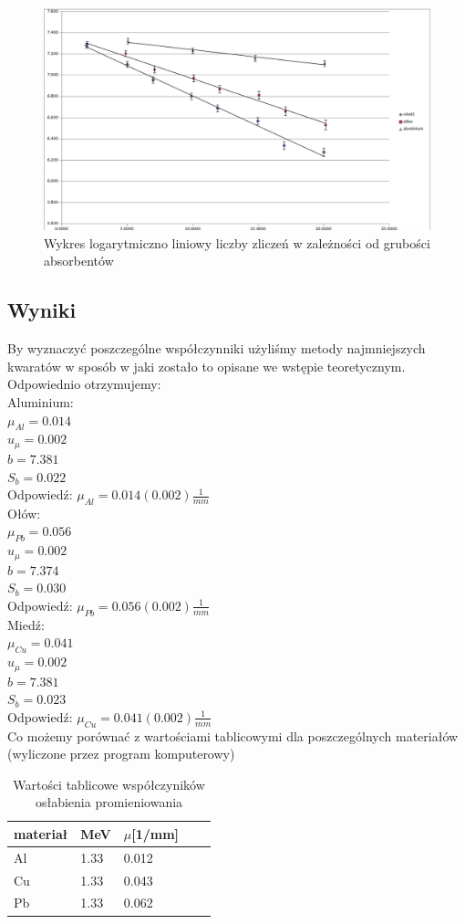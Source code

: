 \documentclass[a4paper]{article}
\begin{document}
\begin{figure}[h!]
\centering
\includegraphics[scale=0.51]{ln_x_wykres.png}
\caption{Wykres logarytmiczno liniowy liczby zliczeń w zależności od grubości absorbentów}
\label{uklad_pomiarowy}
\end{figure}

\newpage
\subsection{Wyniki}
By wyznaczyć poszczególne współczynniki użyliśmy metody najmniejszych kwaratów w sposób w jaki zostało to opisane we wstępie teoretycznym. Odpowiednio otrzymujemy: \\
Aluminium:\\
$\mu_{Al} = 0.014$\\
$u_{\mu} = 0.002$\\
$b = 7.381$\\
$S_{b} = 0.022$\\
Odpowiedź: $\mu_{Al} = 0.014(0.002) \frac{1}{mm}$\\
Ołów:\\
$\mu_{Pb} = 0.056$\\
$u_{\mu} = 0.002$\\
$b = 7.374$\\
$S_{b} = 0.030$\\

Odpowiedź: $\mu_{Pb} = 0.056(0.002) \frac{1}{mm}$\\
Miedź:\\
$\mu_{Cu} = 0.041$\\
$u_{\mu} = 0.002$\\
$b = 7.381$\\
$S_{b} = 0.023$\\
Odpowiedź: $\mu_{Cu} = 0.041(0.002) \frac{1}{mm}$ \\
Co możemy porównać z wartościami tablicowymi dla poszczególnych materiałów (wyliczone przez program komputerowy)
\begin{table}[h!]
\centering
\begin{tabular}{ | l | l | l | l | l | }
\hline
materiał & MeV & $\mu$[1/mm] \\ \hline
Al & 1.33 & 0.012 \\ \hline  
Cu & 1.33 & 0.043 \\ \hline  
Pb & 1.33 & 0.062 \\ \hline  
\end{tabular}
\caption{Wartości tablicowe współczyników osłabienia promieniowania}
\label{pomiary_sruba}
\end{table}
\end{document}
